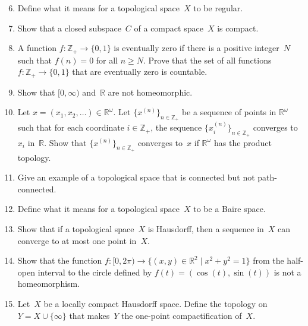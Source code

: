 \documentclass[11pt,letterpaper]{article}
\newenvironment{examproblems}[2]{%
  \def\ProblemHeadingTag{#2}%
  \AssignTaggingSocketPlug{block/list/label}{examproblem}%
  \begin{enumerate}%
  \setcounter{enumi}{#1}%
  \renewcommand{\labelenumi}{\textbf{\theenumi.}}%
  \setlength{\topsep}{0.35em}%
  \setlength{\partopsep}{0pt}%
  \setlength{\itemsep}{0.48em}%
  \setlength{\parsep}{0.18em}%
}{\end{enumerate}}
\begin{document}
\begin{examproblems}{5}{H2}
\def\ProblemHeadingText{Problem 6.}
\item
Define what it means for a topological space~\(X\) to be regular.
\def\ProblemHeadingText{Problem 7.}
\item
Show that a closed subspace~\(C\) of a compact space~\(X\) is compact.
\def\ProblemHeadingText{Problem 8.}
\item
A function \(f:\mathbb{Z}_+\to\{0,1\}\) is eventually zero if there is a positive integer~\(N\) such that \(f(n)=0\) for all \(n\geq N\). Prove that the set of all functions \(f:\mathbb{Z}_+\to\{0,1\}\) that are eventually zero is countable.
\def\ProblemHeadingText{Problem 9.}
\item
Show that \([0,\infty)\) and~\(\mathbb{R}\) are not homeomorphic.
\def\ProblemHeadingText{Problem 10.}
\item
Let \(x=(x_1,x_2,\ldots)\in\mathbb{R}^{\omega}\). Let \(\{x^{(n)}\}_{n\in\mathbb{Z}_+}\) be a sequence of points in \(\mathbb{R}^{\omega}\) such that for each coordinate \(i\in\mathbb{Z}_+\), the sequence \(\{x_i^{(n)}\}_{n\in\mathbb{Z}_+}\) converges to \(x_i\) in~\(\mathbb{R}\). Show that \(\{x^{(n)}\}_{n\in\mathbb{Z}_+}\) converges to~\(x\) if \(\mathbb{R}^{\omega}\) has the product topology.
\def\ProblemHeadingText{Problem 11.}
\item
Give an example of a topological space that is connected but not path-connected.
\def\ProblemHeadingText{Problem 12.}
\item
Define what it means for a topological space~\(X\) to be a Baire space.
\def\ProblemHeadingText{Problem 13.}
\item
Show that if a topological space~\(X\) is Hausdorff, then a sequence in~\(X\) can converge to at most one point in~\(X\).
\def\ProblemHeadingText{Problem 14.}
\item
Show that the function \(f:[0,2\pi)\to\{(x,y)\in\mathbb{R}^2\mid x^2+y^2=1\}\) from the half-open interval to the circle defined by \(f(t)=(\cos(t),\sin(t))\) is not a homeomorphism.
\def\ProblemHeadingText{Problem 15.}
\item
Let~\(X\) be a locally compact Hausdorff space. Define the topology on \(Y=X\cup\{\infty\}\) that makes~\(Y\) the one-point compactification of~\(X\).
\end{examproblems}
\end{document}
